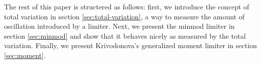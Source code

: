 The rest of this paper is structered as follows: first, we introduce the concept of total variation in section \ref{sec:total-variation}, a way to measure the amount of oscillation introduced by a limiter.
Next, we present the minmod limiter in section \ref{sec:minmod} and show that it behaves nicely as measured by the total variation.
Finally, we present Krivodonova's generalized moment limiter in section \ref{sec:moment}.

